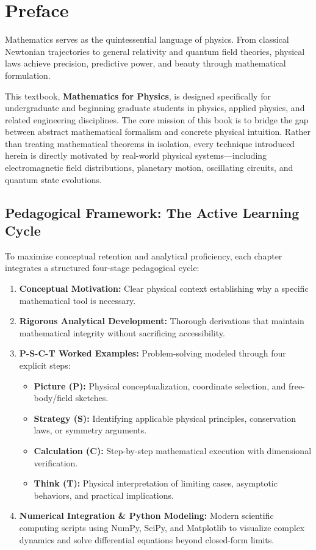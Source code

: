 \chapter*{Preface}

Mathematics serves as the quintessential language of physics. From classical Newtonian trajectories to general relativity and quantum field theories, physical laws achieve precision, predictive power, and beauty through mathematical formulation. 

This textbook, \textbf{Mathematics for Physics}, is designed specifically for undergraduate and beginning graduate students in physics, applied physics, and related engineering disciplines. The core mission of this book is to bridge the gap between abstract mathematical formalism and concrete physical intuition. Rather than treating mathematical theorems in isolation, every technique introduced herein is directly motivated by real-world physical systems---including electromagnetic field distributions, planetary motion, oscillating circuits, and quantum state evolutions.

\section*{Pedagogical Framework: The Active Learning Cycle}

To maximize conceptual retention and analytical proficiency, each chapter integrates a structured four-stage pedagogical cycle:
\begin{enumerate}
    \item \textbf{Conceptual Motivation:} Clear physical context establishing why a specific mathematical tool is necessary.
    \item \textbf{Rigorous Analytical Development:} Thorough derivations that maintain mathematical integrity without sacrificing accessibility.
    \item \textbf{P-S-C-T Worked Examples:} Problem-solving modeled through four explicit steps:
    \begin{itemize}
        \item \textbf{Picture (P):} Physical conceptualization, coordinate selection, and free-body/field sketches.
        \item \textbf{Strategy (S):} Identifying applicable physical principles, conservation laws, or symmetry arguments.
        \item \textbf{Calculation (C):} Step-by-step mathematical execution with dimensional verification.
        \item \textbf{Think (T):} Physical interpretation of limiting cases, asymptotic behaviors, and practical implications.
    \end{itemize}
    \item \textbf{Numerical Integration \& Python Modeling:} Modern scientific computing scripts using NumPy, SciPy, and Matplotlib to visualize complex dynamics and solve differential equations beyond closed-form limits.
\end{enumerate}


